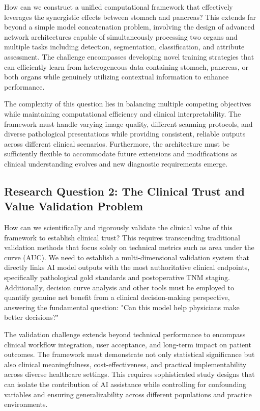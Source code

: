 How can we construct a unified computational framework that effectively leverages the synergistic effects between stomach and pancreas? This extends far beyond a simple model concatenation problem, involving the design of advanced network architectures capable of simultaneously processing two organs and multiple tasks including detection, segmentation, classification, and attribute assessment. The challenge encompasses developing novel training strategies that can efficiently learn from heterogeneous data containing stomach, pancreas, or both organs while genuinely utilizing contextual information to enhance performance.

The complexity of this question lies in balancing multiple competing objectives while maintaining computational efficiency and clinical interpretability. The framework must handle varying image quality, different scanning protocols, and diverse pathological presentations while providing consistent, reliable outputs across different clinical scenarios. Furthermore, the architecture must be sufficiently flexible to accommodate future extensions and modifications as clinical understanding evolves and new diagnostic requirements emerge.

\subsection{Research Question 2: The Clinical Trust and Value Validation Problem}

How can we scientifically and rigorously validate the clinical value of this framework to establish clinical trust? This requires transcending traditional validation methods that focus solely on technical metrics such as area under the curve (AUC). We need to establish a multi-dimensional validation system that directly links AI model outputs with the most authoritative clinical endpoints, specifically pathological gold standards and postoperative TNM staging. Additionally, decision curve analysis and other tools must be employed to quantify genuine net benefit from a clinical decision-making perspective, answering the fundamental question: "Can this model help physicians make better decisions?"

The validation challenge extends beyond technical performance to encompass clinical workflow integration, user acceptance, and long-term impact on patient outcomes. The framework must demonstrate not only statistical significance but also clinical meaningfulness, cost-effectiveness, and practical implementability across diverse healthcare settings. This requires sophisticated study designs that can isolate the contribution of AI assistance while controlling for confounding variables and ensuring generalizability across different populations and practice environments.

